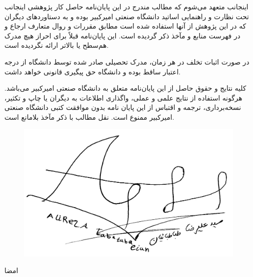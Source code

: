 \vspace*{2.5cm}

اينجانب {\bf{\fname\lname}} متعهد می‌شوم که مطالب مندرج در این پایان‌نامه حاصل کار پژوهشی اینجانب تحت نظارت و راهنمایی اساتید دانشگاه صنعتی امیرکبیر بوده و به دستاوردهای دیگران که در این پژوهش از آنها استفاده شده است مطابق مقررات و روال متعارف ارجاع و در فهرست منابع و مآخذ ذکر گردیده است. این پایان‌نامه قبلاً برای احراز هیچ مدرک هم‌سطح یا بالاتر ارائه نگردیده است.

در صورت اثبات تخلف در هر زمان، مدرک تحصیلی صادر شده توسط دانشگاه از درجه اعتبار ساقط بوده و دانشگاه حق پیگیری قانونی خواهد داشت.


کلیه نتایج و حقوق حاصل از این پایان‌نامه متعلق به دانشگاه صنعتی امیرکبیر می‌باشد. هرگونه استفاده از نتایج علمی و عملی، واگذاری اطلاعات به دیگران یا چاپ و تکثیر، نسخه‌برداری، ترجمه و اقتباس از این پایان نامه بدون موافقت کتبی دانشگاه صنعتی امیرکبیر ممنوع است. 
نقل مطالب با ذکر مآخذ بلامانع است.\\
\vspace{3.5cm}
\begin{figure}
	\centering
	\includegraphics[scale=0.2]{Signature}
\end{figure}

\vspace{-1cm}
{\centerline {\bf{\fname\lname}}}
\vspace*{.2cm}
{\centerline{امضا}}
